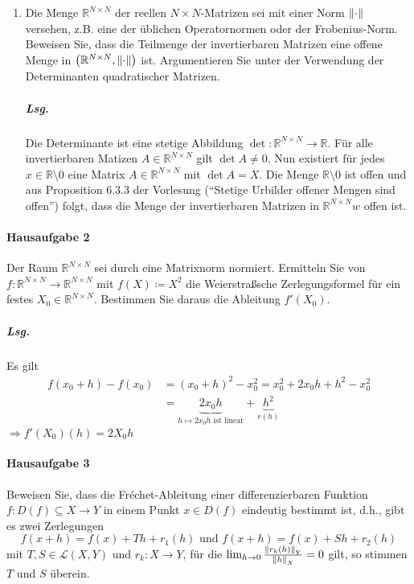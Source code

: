 \documentclass{scrreprt}
\begin{document}
\begin{enumerate}[1)]
\item Die Menge $\mathbb{R}^{N \times N}$ der reellen $N \times N$-Matrizen sei
  mit einer Norm $\norm{\cdot}$ versehen, z.B. eine der üblichen Operatornormen
  oder der Frobenius-Norm.
  Beweisen Sie, dass die Teilmenge der invertierbaren Matrizen eine offene Menge
  in $\qty(\mathbb{R}^{N \times N}, \norm{\cdot})$ ist.
  Argumentieren Sie unter der Verwendung der Determinanten quadratischer
  Matrizen.

  \subparagraph{Lsg.} Die Determinante ist eine stetige Abbildung
  $\det \colon \mathbb{R}^{N \times N} \to \mathbb{R}$.
  Für alle invertierbaren Matizen $A \in \mathbb{R}^{N \times N}$
  gilt $\det A \ne 0$.
  Nun existiert für jedes $x \in \mathbb{R} \setminus \qty{0}$
  eine Matrix $A \in \mathbb{R}^{N \times N}$ mit
  $\det A = X$.
  Die Menge $\mathbb{R} \setminus \qty{0}$ ist offen und aus
  Proposition 6.3.3 der Vorlesung
  (``Stetige Urbilder offener Mengen sind offen'')
  folgt, dass die Menge der invertierbaren Matrizen in
  $\mathbb{R}^{N \times N}w$ offen ist.
\end{enumerate}

\paragraph{Hausaufgabe 2} Der Raum $\mathbb{R}^{N \times N}$ sei durch eine
Matrixnorm normiert.
Ermitteln Sie von $f \colon \mathbb{R}^{N \times N} \to \mathbb{R}^{N \times N}$
mit $f(X) \coloneqq X^2$ die Weierstraßsche Zerlegungsformel für ein festes
$X_0 \in \mathbb{R}^{N \times N}$.
Bestimmen Sie daraus die Ableitung $f'(X_0)$.

\subparagraph{Lsg.}

Es gilt
\begin{align*}
  f(x_0 + h) - f(x_0) &= (x_0 + h)^2 - x_0^2 = x_0^2 + 2x_0h + h^2 - x_0^2 \\
                      &= \underset{h \mapsto 2x_0h \text{ ist linear}}{\underbrace{2x_0h}} +
                        \underset{r(h)}{\underbrace{h^2}}
\end{align*}
$\Rightarrow f'(X_0)(h) = 2X_0h$

\paragraph{Hausaufgabe 3} Beweisen Sie, dass die Fréchet-Ableitung einer
differenzierbaren Funktion $f \colon D(f) \subseteq X \to Y$
in einem Punkt $x \in D(f)$ eindeutig bestimmt ist, d.h., gibt es zwei
Zerlegungen
\[
  f(x + h) = f(x) + Th + r_1(h) \text{ und } f(x + h) = f(x) + Sh + r_2(h)
\]
mit $T, S \in \mathcal{L}(X, Y)$ und $r_k \colon X \to Y$, für die
$\lim_{h \to 0} \frac{\norm{r_k(h)}_Y}{\norm{h}_X} = 0$ gilt, so stimmen
$T$ und $S$ überein.
\end{document}
